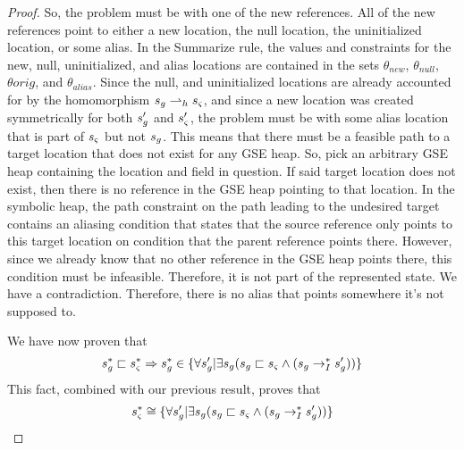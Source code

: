 \begin{proof}
So, the problem must be with one of the new references. All of the new references point to either a new location, the null location, the uninitialized location, or some alias. In the Summarize rule, the values and constraints for the new, null, uninitialized, and alias locations are contained in the sets $\theta_{new}$, $\theta_{null}$, $\theta{orig}$, and $\theta_{alias}$. Since the null, and uninitialized locations are already accounted for by the homomorphism $s_{g} \rightharpoonup_h s_{\varsigma}$, and since a new location was created symmetrically for both $s_{g}^\prime$ and $s_{\varsigma}^\prime$, the problem must be with some alias location that is part of $s_{\varsigma}$ but not $s_{g}$. This means that there must be a feasible path to a target location that does not exist for any GSE heap. So, pick an arbitrary GSE heap containing the location and field in question. If said target location does not exist, then there is no reference in the GSE heap pointing to that location. In the symbolic heap, the path constraint on the path leading to the undesired target contains an aliasing condition that states that the source reference only points to this target location on condition that the parent reference points there. However, since we already know that no other reference in the GSE heap points there, this condition must be infeasible. Therefore, it is not part of the represented state. We have a contradiction. Therefore, there is no alias that points somewhere it's not supposed to.

We have now proven that 
$$ s_{g}^* \sqsubset s_{\varsigma}^*  \Rightarrow  s_{g}^* \in \{\forall s_{g}^\prime | \exists s_{g} (s_{g} \sqsubset s_{\varsigma} \wedge (s_{g} \rightarrow_I^* s_{g}^\prime) ) \}$$
This fact, combined with our previous result, proves that
$$s_{\varsigma}^*  \cong \{\forall s_{g}^\prime | \exists s_{g} (s_{g} \sqsubset s_{\varsigma} \wedge (s_{g} \rightarrow_I^* s_{g}^\prime) ) \}$$

\end{proof}

